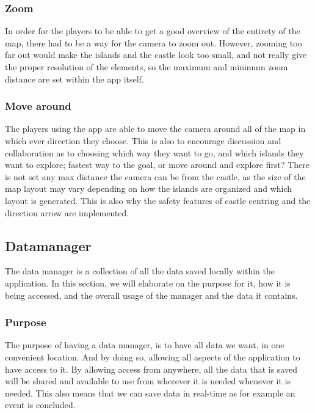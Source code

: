 \subsubsection{Zoom}
	
In order for the players to be able to get a good overview of the entirety of the map, there had to be a way for the camera to zoom out. However, zooming too far out would make the islands and the castle look too small, and not really give the proper resolution of the elements, so the maximum and minimum zoom distance are set within the app itself.	

	
\subsubsection{Move around}

The players using the app are able to move the camera around all of the map in which ever direction they choose. This is also to encourage discussion and collaboration as to choosing which way they want to go, and which islands they want to explore; fastest way to the goal, or move around and explore first?
There is not set any max distance the camera can be from the castle, as the size of the map layout may vary depending on how the islands are organized and which layout is generated. This is also why the safety features of castle centring and the direction arrow are implemented.

\subsection{Datamanager}

The data manager is a collection of all the data saved locally within the application. In this section, we will elaborate on the purpose for it, how it is being accessed, and the overall usage of the manager and the data it contains.

\subsubsection{Purpose}
	
The purpose of having a data manager, is to have all data we want, in one convenient location. And by doing so, allowing all aspects of the application to have access to it. By allowing access from anywhere, all the data that is saved will be shared and available to use from wherever it is needed whenever it is needed. This also means that we can save data in real-time as for example an event is concluded.

